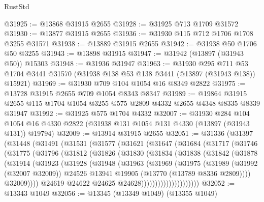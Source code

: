 \begin{lexlean}{RustStd}
\begin{coremodule}
@31925 := @13868 @31915 @2655
@31928 := @31925 @713 @1709 @31572
@31930 := @13877 @31915 @2655
@31936 := @31930 @115 @712 @1706 @1708 @3255 @31571
@31938 := @13889 @31915 @2655
@31942 := @31938 @50 @1706 @50 @3255
@31943 := @13898 @31915
@31947 := @31942 (@13897 (@31943 @50)) @15303
@31948 := @31936 @31947
@31963 := @31930
    @295
    @711
    @53
    @1704
    @3441
    @31570
    (@31938 @138 @53 @138 @3441 (@13897 (@31943 @138)) @15921)
@31969 := @31930 @709 @104 @1054 @16 @8349 @2822
@31975 := @13728 @31915 @2655 @709 @1054 @8343 @8347
@31989 := @19864 @31915 @2655 @115 @1704 @1054 @3255 @575 @2809 @4332 @2655 @4348 @8335 @8339 @31947
@31992 := @31925 @575 @1704 @4332
@32007 := @31930
    @284
    @104
    @1054
    @16
    @4330
    @2822
    (@31938 @131 @1054 @131 @4330 (@13897 (@31943 @131)) @19794)
@32009 := @13914 @31915 @2655
@32051 := @31336
    (@31397
      (@31448
        (@31491
          (@31531
            (@31577
              (@31621
                (@31647
                  (@31684
                    (@31717
                      (@31746
                        (@31775
                          (@31796
                            (@31812
                              (@31826
                                (@31830
                                  (@31834
                                    (@31838
                                      (@31842
                                        (@31878
                                          (@31914
                                            (@31923
                                              (@31928
                                                (@31948
                                                  (@31963
                                                    (@31969
                                                      (@31975
                                                        (@31989
                                                          (@31992 (@32007 @32009))
                                                          @24526
                                                          @13941
                                                          @19905
                                                          (@13770 (@13789 @8336 @2809))))
                                                      @32009))))
                                              @24619
                                              @24622
                                              @24625
                                              @24628)))))))))))))))))))))
@32052 := @13343 @1049
@32056 := @13345 (@13349 @1049) (@13355 @1049)

\end{coremodule}
\end{lexlean}
